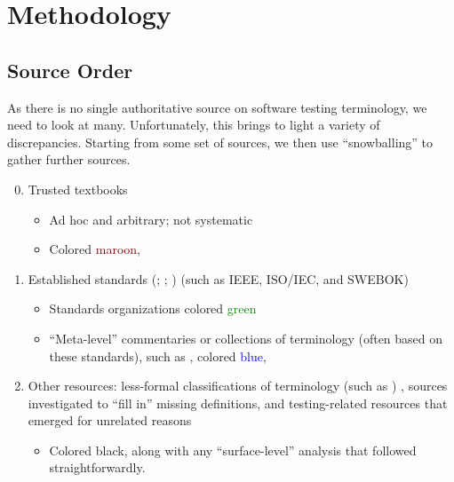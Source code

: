 \section{Methodology}
\label{method}

\subsection{Source Order}
As there is no single authoritative source on software testing terminology,
we need to look at many. Unfortunately, this brings to light a variety of
discrepancies. Starting from some set of sources, we then use
``snowballing''%
to gather further sources.

\begin{enumerate}
      \setcounter{enumi}{-1}
      \item Trusted textbooks
            \citep{Patton2006, PetersAndPedrycz2000, vanVliet2000}
            \begin{itemize}
                  \item Ad hoc and arbitrary; not systematic
                  \item Colored \textcolor{Maroon}{maroon},
            \end{itemize}
      \item Established standards
            \ifnotpaper
                  (\citealp{IEEE2022, SWEBOK2024, SWEBOK2014, IEEE2017, IEEE2013,
                        ISO_IEC2023b, IEEE2012, ISO_IEC2023a}; \citealpISTQB{};
                  \citealp{IEEE2021})
            \else
                  (such as IEEE, ISO/IEC, and SWEBOK)
                  \citep{IEEE2022, SWEBOK2024, SWEBOK2014, IEEE2017, IEEE2013,
                        ISO_IEC2023b, IEEE2012, ISO_IEC2023a, ISTQB, IEEE2021}
            \fi
            \begin{itemize}
                  \item Standards organizations colored \textcolor{green}{green}
                  \item ``Meta-level'' commentaries or collections of
                        terminology (often based on these standards), such as
                        \citep{Firesmith2015}, colored \textcolor{blue}{blue},
            \end{itemize}
      \item Other resources: less-formal classifications of terminology
            \ifnotpaper
                  \citep[e.g.,][]{KuļešovsEtAl2013}%
            \else
                  (such as \citep{KuļešovsEtAl2013})%
            \fi%
            , sources investigated to
            ``fill in'' missing definitions,
            and testing-related resources that emerged for unrelated reasons
            \begin{itemize}
                  \item Colored black, along with any ``surface-level''
                        analysis that followed straightforwardly.
            \end{itemize}
\end{enumerate}

